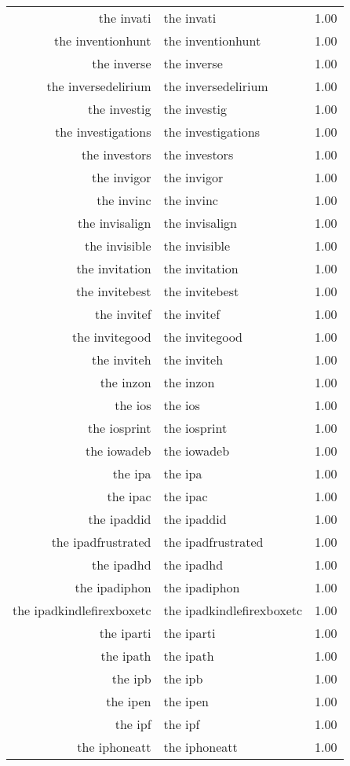 \begin{table}[ht]
\begin{tabular}{rlr}
  the invati & the invati & 1.00 \\ 
  the inventionhunt & the inventionhunt & 1.00 \\ 
  the inverse & the inverse & 1.00 \\ 
  the inversedelirium & the inversedelirium & 1.00 \\ 
  the investig & the investig & 1.00 \\ 
  the investigations & the investigations & 1.00 \\ 
  the investors & the investors & 1.00 \\ 
  the invigor & the invigor & 1.00 \\ 
  the invinc & the invinc & 1.00 \\ 
  the invisalign & the invisalign & 1.00 \\ 
  the invisible & the invisible & 1.00 \\ 
  the invitation & the invitation & 1.00 \\ 
  the invitebest & the invitebest & 1.00 \\ 
  the invitef & the invitef & 1.00 \\ 
  the invitegood & the invitegood & 1.00 \\ 
  the inviteh & the inviteh & 1.00 \\ 
  the inzon & the inzon & 1.00 \\ 
  the ios & the ios & 1.00 \\ 
  the iosprint & the iosprint & 1.00 \\ 
  the iowadeb & the iowadeb & 1.00 \\ 
  the ipa & the ipa & 1.00 \\ 
  the ipac & the ipac & 1.00 \\ 
  the ipaddid & the ipaddid & 1.00 \\ 
  the ipadfrustrated & the ipadfrustrated & 1.00 \\ 
  the ipadhd & the ipadhd & 1.00 \\ 
  the ipadiphon & the ipadiphon & 1.00 \\ 
  the ipadkindlefirexboxetc & the ipadkindlefirexboxetc & 1.00 \\ 
  the iparti & the iparti & 1.00 \\ 
  the ipath & the ipath & 1.00 \\ 
  the ipb & the ipb & 1.00 \\ 
  the ipen & the ipen & 1.00 \\ 
  the ipf & the ipf & 1.00 \\ 
  the iphoneatt & the iphoneatt & 1.00 \\ 

\end{tabular}
\end{table}

